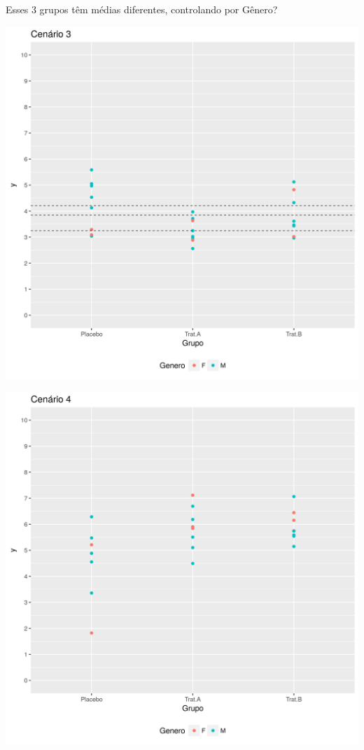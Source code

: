 \documentclass{beamer}
\begin{document}
\begin{frame}{Esses 3 grupos têm médias diferentes, controlando por Gênero?}
  \begin{center}
    \includegraphics[height=.9\textheight]{Cap13-30/cenario12_medias}

  \end{center}
\end{frame}

\begin{frame}
  \begin{center}
    \includegraphics[height=.9\textheight]{Cap13-30/cenario22}
  \end{center}
\end{frame}
\end{document}
